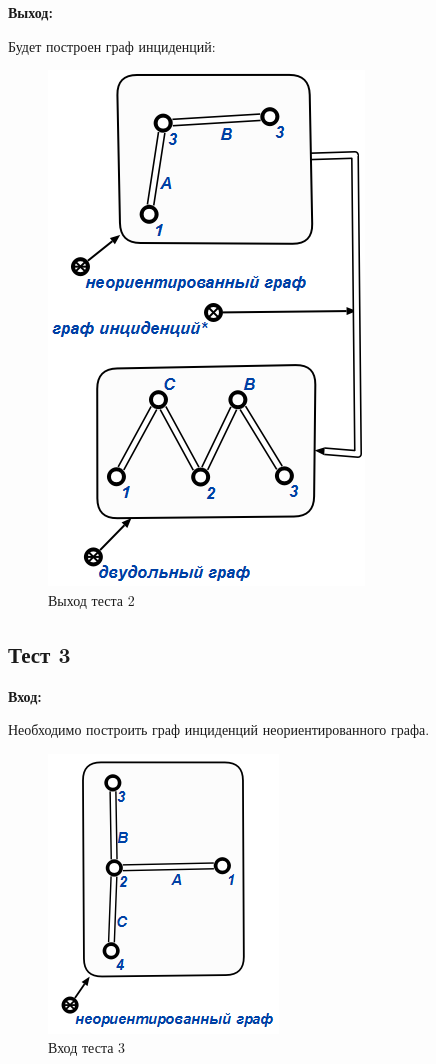 \textbf{Выход:}

Будет построен граф инциденций:

\begin{figure}[H]
  \centering
  \includegraphics[scale=0.7]{images/16.png}
  \caption{Выход теста 2}
\end{figure}

\subsection{Тест 3}

\textbf{Вход:}

Необходимо построить граф инциденций неориентированного графа.

\begin{figure}[H]
  \centering
  \includegraphics[scale=0.7]{images/17.png}
  \caption{Вход теста 3}
\end{figure}

